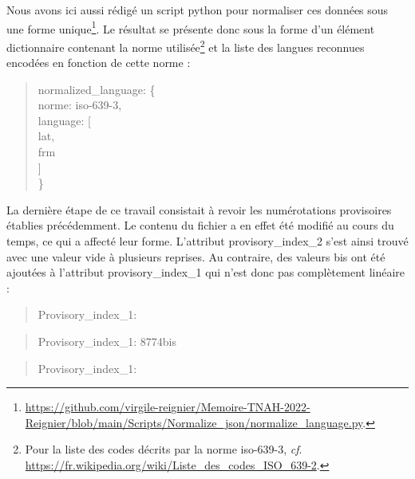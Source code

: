 \documentclass[a4paper,12pt,twoside]{book}
\begin{document}
	\pagebreak
	
	\noindent Nous avons ici aussi rédigé un script python pour normaliser ces données sous une forme unique\footnote{\url{https://github.com/virgile-reignier/Memoire-TNAH-2022-Reignier/blob/main/Scripts/Normalize_json/normalize_language.py}.}. Le résultat se présente donc sous la forme d'un élément dictionnaire contenant la norme utilisée\footnote{Pour la liste des codes décrits par la norme iso-639-3, \textit{cf}. \url{https://fr.wikipedia.org/wiki/Liste_des_codes_ISO_639-2}.} et la liste des langues reconnues encodées en fonction de cette norme :
	
	\begin{quotation}
				\textquotesingle normalized\_language\textquotesingle : \{\\
			\indent\indent \textquotesingle norme\textquotesingle : \textquotesingle iso-639-3\textquotesingle ,\\
			\indent\indent \textquotesingle language\textquotesingle : [\\
			\indent\indent\indent \textquotesingle lat\textquotesingle ,\\
			\indent\indent\indent \textquotesingle frm\textquotesingle \\
			\indent\indent]\\
			\indent\}
	\end{quotation}
	
	\noindent La dernière étape de ce travail consistait à revoir les numérotations provisoires établies précédemment. Le contenu du fichier a en effet été modifié au cours du temps, ce qui a affecté leur forme. L'attribut \og provisory\_index\_2\fg{} s'est ainsi trouvé avec une valeur vide à plusieurs reprises. Au contraire, des valeurs \og bis\fg{} ont été ajoutées à l'attribut \og provisory\_index\_1\fg{} qui n'est donc pas complètement linéaire :
	
	\begin{quotation}
		\textquotesingle Provisory\_index\_1\textquotesingle : \textquotesingle
	\end{quotation}
	
	\begin{quotation}
		\textquotesingle Provisory\_index\_1\textquotesingle : \textquotesingle 8774bis\textquotesingle
	\end{quotation}

	\begin{quotation}
		\textquotesingle Provisory\_index\_1\textquotesingle : \textquotesingle
	\end{quotation}
	
\end{document}
